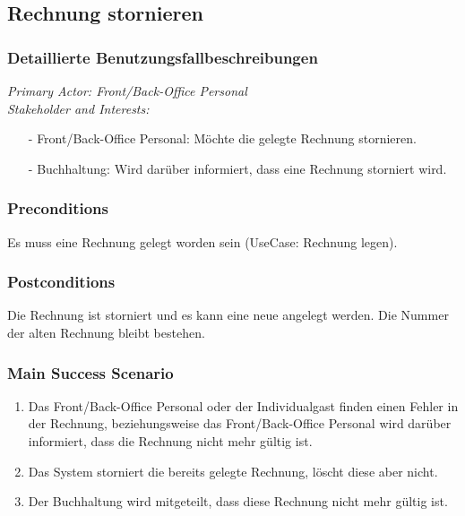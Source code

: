\documentclass[./detailed_overview_usecases.tex]{subfiles}
\begin{document}
    \subsection{Rechnung stornieren}
    \subsubsection{Detaillierte Benutzungsfallbeschreibungen}
    \textit{Primary Actor: Front/Back-Office Personal}
    \\
    \textit{Stakeholder and Interests:}
    \begin{itemize}
        \item[-] Front/Back-Office Personal: Möchte die gelegte Rechnung stornieren.
        \item[-] Buchhaltung: Wird darüber informiert, dass eine Rechnung storniert wird.
    \end{itemize}

    \subsubsection*{Preconditions}
    Es muss eine Rechnung gelegt worden sein (UseCase: Rechnung legen).

    \subsubsection*{Postconditions}
    Die Rechnung ist storniert und es kann eine neue angelegt werden. Die Nummer der alten Rechnung bleibt bestehen.

    \subsubsection*{Main Success Scenario}
    \begin{enumerate}
        \item Das Front/Back-Office Personal oder der Individualgast finden einen Fehler in der Rechnung, beziehungsweise das Front/Back-Office Personal wird darüber informiert, dass die Rechnung nicht mehr gültig ist.
        \item Das System storniert die bereits gelegte Rechnung, löscht diese aber nicht.
        \item Der Buchhaltung wird mitgeteilt, dass diese Rechnung nicht mehr gültig ist.
    \end{enumerate}
\end{document}
